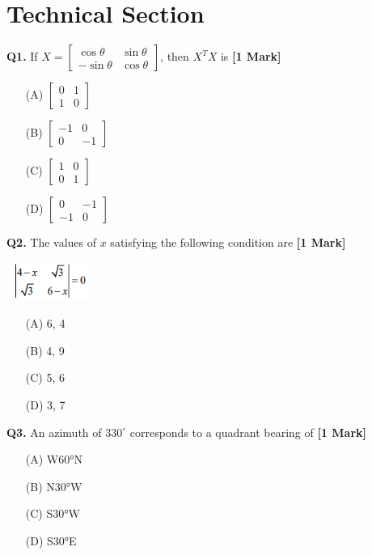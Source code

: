 \documentclass[11pt]{article}
\newcommand{\questiona}[2]{
    \noindent\textbf{Q#2.} #1 \hfill \textbf{[1 Mark]}
}
\begin{document}
\section*{Technical Section}

\questiona{If \( X = \begin{bmatrix} \cos\theta & \sin\theta \\ -\sin\theta & \cos\theta \end{bmatrix} \), then \( X^T X \) is}{1}
\begin{enumerate}
    \item[(A)] \( \begin{bmatrix} 0 & 1 \\ 1 & 0 \end{bmatrix} \)
    \item[(B)] \( \begin{bmatrix} -1 & 0 \\ 0 & -1 \end{bmatrix} \)
    \item[(C)] \( \begin{bmatrix} 1 & 0 \\ 0 & 1 \end{bmatrix} \)
    \item[(D)] \( \begin{bmatrix} 0 & -1 \\ -1 & 0 \end{bmatrix} \)
\end{enumerate}
\vspace{0.5cm}

\questiona{The values of \( x \) satisfying the following condition are}{2}
\begin{center}
\includegraphics[width=0.2\textwidth]{figures/2.png}
\end{center}
\begin{enumerate}
    \item[(A)] 6, 4
    \item[(B)] 4, 9
    \item[(C)] 5, 6
    \item[(D)] 3, 7
\end{enumerate}
\vspace{0.5cm}

\questiona{An azimuth of \( 330^\circ \) corresponds to a quadrant bearing of}{3}
\begin{enumerate}
    \item[(A)] W60°N
    \item[(B)] N30°W
    \item[(C)] S30°W
    \item[(D)] S30°E
\end{enumerate}
\vspace{0.5cm}
\end{document}
